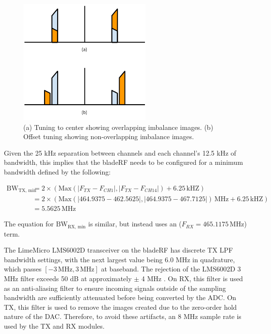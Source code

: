 \begin{figure}[h]
  \centering
  \includegraphics[height=2.5in]{images/frs/iq_imbalance_offset_tuning.pdf}
  \caption{(a) Tuning to center showing overlapping imbalance images. (b) Offset tuning showing non-overlapping imbalance images.}
  \label{fig:iq_imbalance}
\end{figure}

Given the 25 kHz separation between channels and each channel's 12.5 kHz of
bandwidth, this implies that the bladeRF needs to be configured for a
minimum bandwidth defined by the following:

\begin{align*}
  \text{BW}_{\text{TX, min}} &=
  2 \times \left( \text{Max}\left(|F_{TX} - F_{CH1}|, |F_{TX} - F_{CH14}|\right) + 6.25 \,\text{kHZ} \right) \\
  &= 2 \times \left( \text{Max}\left(|464.9375 - 462.5625|, |464.9375 - 467.7125|\right) \, \text{MHz} + 6.25 \,\text{kHZ} \right) \\
  &= 5.5625 \, \text{MHz}
\end{align*}

The equation for $\text{BW}_{\text{RX, min}}$ is similar, but instead uses an
($F_{RX} = 465.1175 \,\text{MHz}$) term.

The LimeMicro LMS6002D transceiver \cite{LMS6002D_OVERVIEW} on the bladeRF has
discrete TX \ac{LPF} bandwidth settings, with the next largest value being 6.0
MHz in quadrature, which passes $[-3 \,\text{MHz}, 3 \,\text{MHz}]$ at baseband. The
rejection of the LMS6002D 3 MHz filter exceeds 50 dB at approximately $\pm$ 4
MHz \cite{LMS6002D_DATASHEET}. On RX, this filter is used as an anti-aliasing filter
to ensure incoming signals outside of the sampling bandwidth are sufficiently
attenuated before being converted by the ADC.  On TX, this filter is used to
remove the images created due to the zero-order hold nature of the DAC.
Therefore, to avoid these artifacts, an 8 MHz sample rate is used by the
\ac{TX} and \ac{RX} modules.

